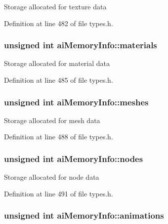 Storage allocated for texture data 

Definition at line 482 of file types.h.\hypertarget{structai_memory_info_08b2ccd0cef8dec36e47fc1beeb168f1}{
\subsubsection[materials]{\setlength{\rightskip}{0pt plus 5cm}unsigned int {\bf aiMemoryInfo::materials}}}
\label{structai_memory_info_08b2ccd0cef8dec36e47fc1beeb168f1}


Storage allocated for material data 

Definition at line 485 of file types.h.\hypertarget{structai_memory_info_c24ed2b3c141f043765b6e34783d1e24}{
\subsubsection[meshes]{\setlength{\rightskip}{0pt plus 5cm}unsigned int {\bf aiMemoryInfo::meshes}}}
\label{structai_memory_info_c24ed2b3c141f043765b6e34783d1e24}


Storage allocated for mesh data 

Definition at line 488 of file types.h.\hypertarget{structai_memory_info_5a084942c81a29f7bb03c9903430b033}{
\subsubsection[nodes]{\setlength{\rightskip}{0pt plus 5cm}unsigned int {\bf aiMemoryInfo::nodes}}}
\label{structai_memory_info_5a084942c81a29f7bb03c9903430b033}


Storage allocated for node data 

Definition at line 491 of file types.h.\hypertarget{structai_memory_info_f82394dc3a17a644061ed647817efa68}{
\subsubsection[animations]{\setlength{\rightskip}{0pt plus 5cm}unsigned int {\bf aiMemoryInfo::animations}}}
\label{structai_memory_info_f82394dc3a17a644061ed647817efa68}


